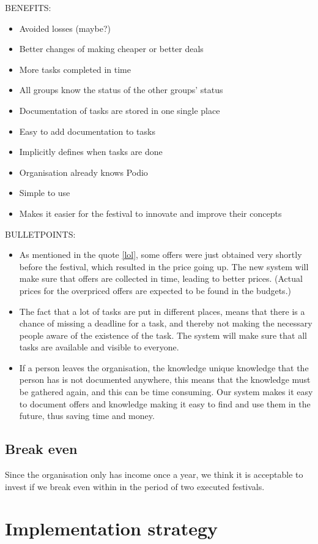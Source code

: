 BENEFITS:
\begin{itemize}
    \item Avoided losses (maybe?)
    \item Better changes of making cheaper or better deals
    \item More tasks completed in time
    \item All groups know the status of the other groups' status
    \item Documentation of tasks are stored in one single place
    \item Easy to add documentation to tasks
    \item Implicitly defines when tasks are done
    \item Organisation already knows Podio
    \item Simple to use
    \item Makes it easier for the festival to innovate and improve their concepts
\end{itemize}

BULLETPOINTS:
\begin{itemize}
    \item As mentioned in the quote \ref{lol}, some offers were just obtained very shortly before
    the festival, which resulted in the price going up. The new system will make sure that offers
    are collected in time, leading to better prices. (Actual prices for the overpriced offers are
    expected to be found in the budgets.)
    \item The fact that a lot of tasks are put in different places, means that there is a chance of
    missing a deadline for a task, and thereby not making the necessary people aware of the
    existence of the task. The system will make sure that all tasks are available and visible to
    everyone.
    \item If a person leaves the organisation, the knowledge unique knowledge that the person has is
    not documented anywhere, this means that the knowledge must be gathered again, and this can be
    time consuming. Our system makes it easy to document offers and knowledge making it easy to find
    and use them in the future, thus saving time and money.
\end{itemize}

\subsection{Break even}
\label{sub:break_even}
Since the organisation only has income once a year, we think it is acceptable to invest if we break
even within in the period of two executed festivals.

\section{Implementation strategy}


